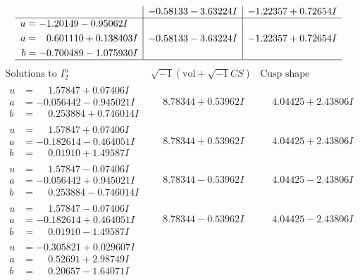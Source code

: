 \documentclass[1p]{elsarticle_modified}
\theoremstyle{definition}
\newcommand{\I}{\sqrt{-1}}
\begin{document}
$$\begin{array}{c|c|c}
 & -0.58133 - 3.63224 I & -1.22357 + 0.72654 I \\ \hline\begin{aligned}
u &= -1.20149 - 0.95062 I \\
a &= \phantom{-}0.601110 + 0.138403 I \\
b &= -0.700489 - 1.075930 I\end{aligned}
 & -0.58133 - 3.63224 I & -1.22357 + 0.72654 I\\
 \hline 
 \end{array}$$\newpage$$\begin{array}{c|c|c}  
\text{Solutions to }I^u_{2}& \I (\text{vol} + \sqrt{-1}CS) & \text{Cusp shape}\\
 \hline 
\begin{aligned}
u &= \phantom{-}1.57847 + 0.07406 I \\
a &= -0.056442 - 0.945021 I \\
b &= \phantom{-}0.253884 + 0.746014 I\end{aligned}
 & \phantom{-}8.78344 + 0.53962 I & \phantom{-}4.04425 + 2.43806 I \\ \hline\begin{aligned}
u &= \phantom{-}1.57847 + 0.07406 I \\
a &= -0.182614 - 0.464051 I \\
b &= \phantom{-}0.01910 + 1.49587 I\end{aligned}
 & \phantom{-}8.78344 + 0.53962 I & \phantom{-}4.04425 + 2.43806 I \\ \hline\begin{aligned}
u &= \phantom{-}1.57847 - 0.07406 I \\
a &= -0.056442 + 0.945021 I \\
b &= \phantom{-}0.253884 - 0.746014 I\end{aligned}
 & \phantom{-}8.78344 - 0.53962 I & \phantom{-}4.04425 - 2.43806 I \\ \hline\begin{aligned}
u &= \phantom{-}1.57847 - 0.07406 I \\
a &= -0.182614 + 0.464051 I \\
b &= \phantom{-}0.01910 - 1.49587 I\end{aligned}
 & \phantom{-}8.78344 - 0.53962 I & \phantom{-}4.04425 - 2.43806 I \\ \hline\begin{aligned}
u &= -0.305821 + 0.029607 I \\
a &= \phantom{-}0.52691 + 2.98749 I \\
b &= \phantom{-}0.20657 - 1.64071 I\end{aligned}

\end{array}$$
\end{document}
